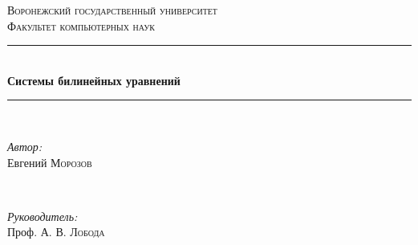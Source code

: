 \begin{titlepage}

\newcommand{\HRule}{\rule{\linewidth}{0.5mm}} %

\center %
 

\textsc{\LARGE Воронежский государственный университет}\\[1.5cm] %
\textsc{\Large Факультет компьютерных наук}\\[0.5cm] %


\HRule \\[0.4cm]
{ \huge \bfseries Системы билинейных уравнений}\\[0.4cm] %
\HRule \\[1.5cm]
 

\begin{minipage}{0.4\textwidth}
\begin{flushleft} \large
\emph{Автор:}\\
Евгений \textsc{Морозов} %
\end{flushleft}
\end{minipage}
~
\begin{minipage}{0.4\textwidth}
\begin{flushright} \large
\emph{Руководитель:} \\
Проф. А. В. \textsc{Лобода} %
\end{flushright}
\end{minipage}\\[2cm]



\end{titlepage}
